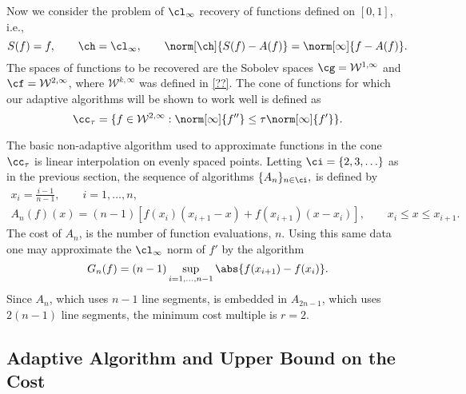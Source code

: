 
Now we consider the problem of $\cl_{\infty}$ recovery of functions defined on $[0,1]$, i.e.,
\[
S(f)=f, \qquad \ch=\cl_{\infty}, \qquad \norm[\ch]{S(f)-A(f)}=\norm[\infty]{f-A(f)}.
\]
The spaces of functions to be recovered are the Sobolev spaces $\cg = \mathcal{W}^{1,\infty}$ and $\cf = \mathcal{W}^{2,\infty}$, where $\mathcal{W}^{k,\infty}$ was defined in \eqref{??}.  The cone of functions for which our adaptive algorithms will be shown to work well is defined as
\begin{equation}\label{taudef}
\cc_{\tau}=\{f \in  \mathcal{W}^{2,\infty} : \norm[\infty]{f''}\leq \tau\norm[\infty]{f'}\}.
\end{equation}

The basic non-adaptive algorithm used to approximate functions in the cone $\cc_{\tau}$ is linear interpolation on evenly spaced points.  Letting $\ci=\{2, 3, \ldots\}$ as in the previous section, the sequence of algorithms $\{A_n\}_{n \in \ci},$ is defined by
\begin{subequations} \label{linearspline}
\begin{gather}
x_i=\frac{i-1}{n-1}, \qquad i=1, \ldots, n, \\
A_{n}(f)(x)=(n-1) \left[ f(x_{i})(x_{i+1}-x) +f(x_{i+1})(x-x_i) \right], \qquad x_i \leq x \leq x_{i+1}.
\end{gather}
\end{subequations}
The cost of $A_n$, is the number of function evaluations, $n$.  Using this same data one may approximate the $\cl_\infty$ norm of $f'$ by the algorithm
\begin{equation}\label{estfirstderiv}
G_n(f) = (n-1) \sup_{i=1, \ldots, n-1} \abs{f(x_{i+1})-f(x_i)}.
\end{equation}
Since $A_n$, which uses $n-1$ line segments, is embedded in $A_{2n-1}$, which uses $2(n-1)$ line segments, the minimum cost multiple is $r=2$.

\subsection{Adaptive Algorithm and Upper Bound on the Cost}

